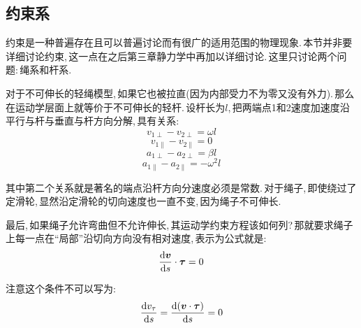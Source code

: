 \subsection{约束系}
约束是一种普遍存在且可以普遍讨论而有很广的适用范围的物理现象.\,本节并非要详细讨论约束,\,这一点在之后第三章静力学中再加以详细讨论.\,这里只讨论两个问题:\,绳系和杆系.

对于不可伸长的轻绳模型,\,如果它也被拉直(因为内部受力不为零又没有外力).\,那么在运动学层面上就等价于不可伸长的轻杆.\,设杆长为$l$,\,把两端点1和2速度加速度沿平行与杆与垂直与杆方向分解,\,具有关系:
\[v_{1\perp}-v_{2\perp}=\omega l\]
\[v_{1\parallel}-v_{2\parallel}=0\]
\[a_{1\perp}-a_{2\perp}=\beta l\]
\[a_{1\parallel}-a_{2\parallel}=-\omega^2 l\]

其中第二个关系就是著名的端点沿杆方向分速度必须是常数.\,对于绳子,\,即使绕过了定滑轮,\,显然沿定滑轮的切向速度也一直不变,\,因为绳子不可伸长.

最后,\,如果绳子允许弯曲但不允许伸长,\,其运动学约束方程该如何列?\,那就要求绳子上每一点在``局部''沿切向方向没有相对速度,\,表示为公式就是:
\[\frac{\textrm{d} \boldsymbol{v}}{\textrm{d} s}\cdot\boldsymbol{\tau}=0\]

注意这个条件不可以写为:
\[\frac{\textrm{d} v_\tau}{\textrm{d} s}=\frac{\textrm{d} (\boldsymbol{v}\cdot\boldsymbol{\tau})}{\textrm{d} s}=0\]